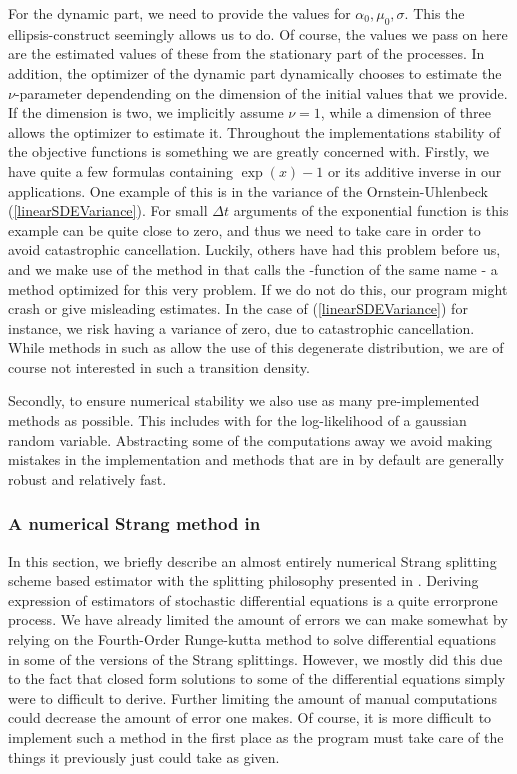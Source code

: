 For the dynamic part, we need to provide the values for $\alpha_0, \mu_0, \sigma$. This the ellipsis-construct seemingly allows us to do. Of course, the values we pass on here are the estimated values of these from the stationary part of the processes. In addition, the optimizer of the dynamic part dynamically chooses to estimate the $\nu$-parameter dependending on the dimension of the initial values that we provide. If the dimension is two, we implicitly assume $\nu = 1$, while a dimension of three allows the optimizer to estimate it. Throughout the implementations stability of the objective functions is something we are greatly concerned with. Firstly, we have quite a few formulas containing $\exp\left(x\right) - 1$ or its additive inverse in our applications. One example of this is in the variance of the Ornstein-Uhlenbeck (\ref{linearSDEVariance}). For small $\Delta t$ arguments of the exponential function is this example can be quite close to zero, and thus we need to take care in order to avoid catastrophic cancellation. Luckily, others have had this problem before us, and we make use of the  method in  that calls the -function of the same name \cite{cppreference_expm1} - a method optimized for this very problem. If we do not do this, our program might crash or give misleading estimates. In the case of (\ref{linearSDEVariance}) for instance, we risk having a variance of zero, due to catastrophic cancellation. While methods in  such as  allow the use of this degenerate distribution, we are of course not interested in such a transition density.

Secondly, to ensure numerical stability we also use as many pre-implemented methods as possible. This includes  with  for the log-likelihood of a gaussian random variable. Abstracting some of the computations away we avoid making mistakes in the implementation and methods that are in  by default are generally robust and relatively fast.
\subsubsection{A numerical Strang method in }\label{subsection:NumericalStrangSplitting}
In this section, we briefly describe an almost entirely numerical Strang splitting scheme based estimator with the splitting philosophy presented in \cite{SplittingSchemes}. Deriving expression of estimators of stochastic differential equations is a quite errorprone process. We have already limited the amount of errors we can make somewhat by relying on the Fourth-Order Runge-kutta method to solve differential equations in some of the versions of the Strang splittings. However, we mostly did this due to the fact that closed form solutions to some of the differential equations simply were to difficult to derive. Further limiting the amount of manual computations could decrease the amount of error one makes. Of course, it is more difficult to implement such a method in the first place as the program must take care of the things it previously just could take as given.

